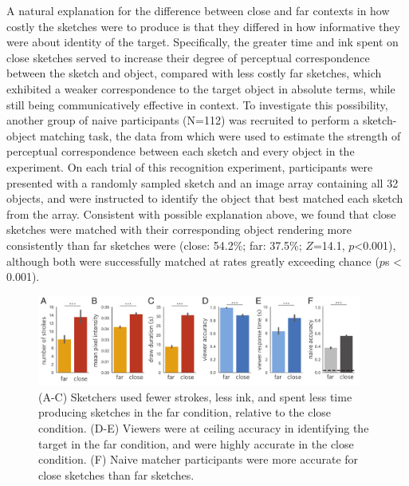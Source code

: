 \documentclass[9pt,twocolumn,twoside]{pnas-new}
\begin{document}
A natural explanation for the difference between close and far contexts in how costly the sketches were to produce is that they differed in how informative they were about identity of the target. Specifically, the greater time and ink spent on close sketches served to increase their degree of perceptual correspondence between the sketch and object, compared with less costly far sketches, which exhibited a weaker correspondence to the target object in absolute terms, while still being communicatively effective in context. 
To investigate this possibility, another group of naive participants (N=112) was recruited to perform a sketch-object matching task, the data from which were used to estimate the strength of perceptual correspondence between each sketch and every object in the experiment. 
On each trial of this recognition experiment, participants were presented with a randomly sampled sketch and an image array containing all 32 objects, and were instructed to identify the object that best matched each sketch from the array. 
Consistent with possible explanation above, we found that close sketches were matched with their corresponding object rendering more consistently than far sketches were (close: 54.2\%; far: 37.5\%; $Z$=14.1, $p$<0.001), although both were successfully matched at rates greatly exceeding chance ($p$s < 0.001).

\begin{figure}[htbp]
\centering
\includegraphics[width=0.95\textwidth]{figures/3_behavioral_performance.pdf}
\caption{(A-C) Sketchers used fewer strokes, less ink, and spent less time producing sketches in the far condition, relative to the close condition. (D-E) Viewers were at ceiling accuracy in identifying the target in the far condition, and were highly accurate in the close condition. (F) Naive matcher participants were more accurate for close sketches than far sketches.}
\label{task_performance}
\end{figure}

\end{document}
